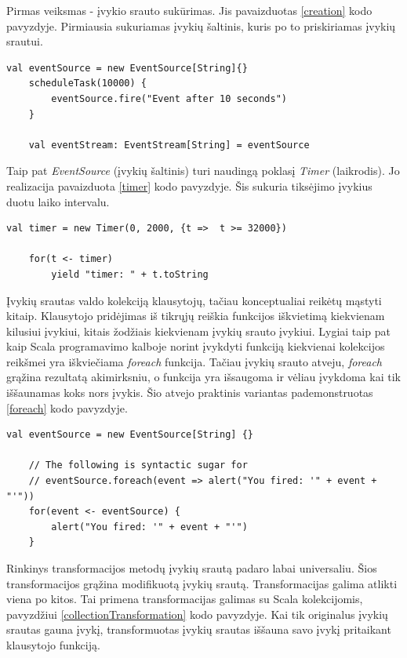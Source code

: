Pirmas veiksmas - įvykio srauto sukūrimas. Jis pavaizduotas \ref{creation} kodo pavyzdyje.  Pirmiausia sukuriamas įvykių šaltinis, kuris po to priskiriamas įvykių srautui.

\begin{lstlisting}[caption=- įvykių srauto sukūrimas, label=creation]
	val eventSource = new EventSource[String]{}
	scheduleTask(10000) {
		eventSource.fire("Event after 10 seconds")
	}

	val eventStream: EventStream[String] = eventSource
\end{lstlisting}

Taip pat \textit{EventSource} (įvykių šaltinis) turi naudingą poklasį \textit{Timer} (laikrodis). Jo realizacija pavaizduota \ref{timer} kodo pavyzdyje. Šis sukuria tiksėjimo įvykius duotu laiko intervalu.

\begin{lstlisting}[caption=- įvykių srauto sukūrimas, label=timer]
	val timer = new Timer(0, 2000, {t =>  t >= 32000})

	for(t <- timer)
    	yield "timer: " + t.toString
\end{lstlisting}

Įvykių srautas valdo kolekciją klausytojų, tačiau konceptualiai reikėtų mąstyti kitaip. Klausytojo pridėjimas iš tikrųjų reiškia funkcijos iškvietimą kiekvienam kilusiui įvykiui, kitais žodžiais kiekvienam įvykių srauto įvykiui. Lygiai taip pat kaip Scala programavimo kalboje norint įvykdyti funkciją kiekvienai kolekcijos reikšmei yra iškviečiama \textit{foreach} funkcija. Tačiau įvykių srauto atveju, \textit{foreach} grąžina rezultatą akimirksniu, o funkcija yra išsaugoma ir vėliau įvykdoma kai tik iššaunamas koks nors įvykis. Šio atvejo praktinis variantas pademonstruotas \ref{foreach} kodo pavyzdyje.

\begin{lstlisting}[caption=- klausytojų pridėjimas, label=foreach]
	val eventSource = new EventSource[String] {}
	  
	// The following is syntactic sugar for
	// eventSource.foreach(event => alert("You fired: '" + event + "'"))
	for(event <- eventSource) {
	 	alert("You fired: '" + event + "'")
	}

\end{lstlisting}

Rinkinys transformacijos metodų įvykių srautą padaro labai universaliu. Šios transformacijos grąžina modifikuotą įvykių srautą. Transformacijas galima atlikti viena po kitos. Tai primena transformacijas galimas su Scala kolekcijomis, pavyzdžiui \ref{collectionTransformation} kodo pavyzdyje. Kai tik originalus įvykių srautas gauna įvykį, transformuotas įvykių srautas iššauna savo įvykį pritaikant klausytojo funkciją.

